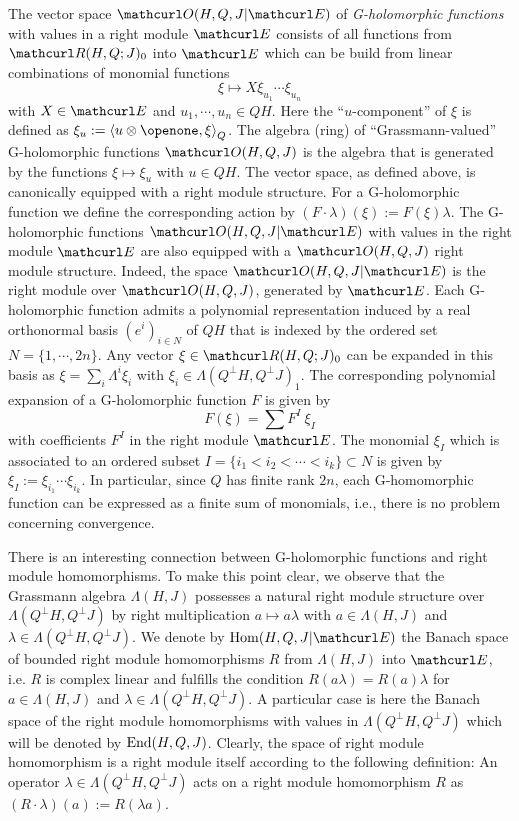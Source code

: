 \documentclass[pra,twoside,amsmath,amsfonts,amssymb,superscriptaddress,showpacs]{revtex4}
\def\9#1{{\mathcurl #1}}
\def\I{\openone}
\newcommand{\RIGG}[3]{{\langle}{#1},{#2}{\rangle}_{#3}}
\newcommand{\GR}[2]{\Lambda(#1,#2)}
\newcommand{\PHSP}[3]{\9R(#1,#3;#2)}
\newcommand{\GHOL}[4]{\9O(#1,#3,#2|#4)}
\newcommand{\RHOL}[3]{\9O(#1,#3,#2)}
\newcommand{\RHOM}[4]{{\rm Hom}(#1,#3,#2|#4)}
\newcommand{\REND}[3]{{\rm End}(#1,#3,#2)}
\begin{document}
The vector space $\GHOL{H}{J}{Q}{\9E}$ of {\em G-holomorphic functions} with values in a right
module $\9E$ consists of all functions from $\PHSP{H}{J}{Q}_0$ into $\9E$ which can be
build from linear combinations of monomial functions
\begin{equation}
\xi\mapsto X\xi_{u_1}\cdots\xi_{u_n}
\end{equation}
with $X\in\9E$ and $u_1,\cdots, u_n\in QH$. Here the ``$u$-component'' of $\xi$ is  defined as
$\xi_u:=\RIGG{u\otimes\I}{\xi}{Q}$. The algebra (ring) of ``Grassmann-valued'' G-holomorphic
functions $\RHOL{H}{J}{Q}$ is
the algebra that is generated by the functions $\xi\mapsto \xi_u$ with $u\in QH$. The vector space,
as defined above, is canonically equipped with a right module structure. For a G-holomorphic
function we define the corresponding action by $(F\cdot\lambda)(\xi):=F(\xi)\lambda$. The
G-holomorphic functions $\GHOL{H}{J}{Q}{\9E}$ with values in the right module $\9E$ are also
equipped with a $\RHOL{H}{J}{Q}$ right module structure. Indeed, the space $\GHOL{H}{J}{Q}{\9E}$ is
the right module over $\RHOL{H}{J}{Q}$, generated by $\9E$. Each G-holomorphic function admits a
polynomial representation induced by a real orthonormal basis $(e^i)_{i\in N}$ of $QH$ that
is indexed by the ordered set
$N=\{1,\cdots,2n\}$. Any vector $\xi\in\PHSP{H}{J}{Q}_0$ can be expanded
in this basis as $\xi=\sum_i\Lambda^i\xi_i$ with $\xi_i\in\GR{Q^\perp H}{Q^\perp J}_1$. The
corresponding polynomial expansion of a G-holomorphic function $F$ is given by 
\begin{equation}
F(\xi)=\sum F^I \ \xi_I
\end{equation}
with coefficients $F^I$ in the right module $\9E$. The monomial $\xi_I$ which is
associated to an ordered subset $I=\{i_1<i_2<\cdots<i_k\}\subset N$ is given by
$\xi_I:=\xi_{i_1}\cdots\xi_{i_k}$. In particular, since $Q$ has finite rank $2n$, each G-homomorphic
function can be expressed as a finite sum of monomials, i.e., there is no problem
concerning convergence. 

There is an interesting connection between G-holomorphic
functions and right module homomorphisms. To make this point clear, we observe that the Grassmann
algebra
$\GR{H}{J}$ possesses a natural right module structure over $\GR{Q^\perp H}{Q^\perp J}$ by
right multiplication $a\mapsto a\lambda$ with $a\in\GR{H}{J}$ and $\lambda\in\GR{Q^\perp H}{Q^\perp
J}$. We denote by $\RHOM{H}{J}{Q}{\9E}$ the Banach space of bounded right module homomorphisms $R$
from $\GR{H}{J}$ into $\9E$, i.e. $R$ is complex linear and fulfills the condition
$R(a\lambda)=R(a)\lambda$ for $a\in\GR{H}{J}$ and $\lambda\in\GR{Q^\perp H}{Q^\perp J}$. A
particular case is here the Banach space of the right module homomorphisms with values in
$\GR{Q^\perp H}{Q^\perp J}$ which will be denoted by $\REND{H}{J}{Q}$. Clearly, the space of right
module homomorphism is a right module itself according to the following definition: An
operator $\lambda\in\GR{Q^\perp H}{Q^\perp J}$ acts on a right module homomorphism $R$
as $(R\cdot\lambda)(a):=R(\lambda a)$. 
\end{document}
